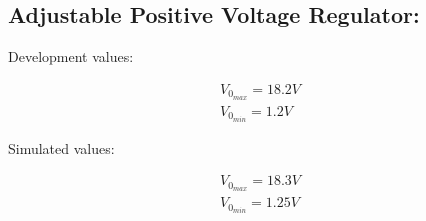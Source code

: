 \subsection{Adjustable Positive Voltage Regulator:}

\begin{multicols}{2}
\begin{tasks}
\task Development values:

\begin{ceqn}
\begin{align}
V_{0_{max}} = 18.2 V \\
V_{0_{min}} = 1.2 V
\end{align}
\end{ceqn}

\task Simulated values:

\begin{ceqn}
\begin{align}
V_{0_{max}} = 18.3 V \\
V_{0_{min}} = 1.25 V
\end{align}
\end{ceqn}
\end{tasks}
\end{multicols}

